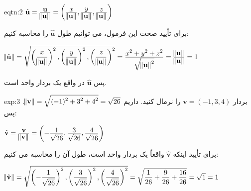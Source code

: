 {\begin{spacing}{1.5}
        \begin{eqtn}{eqtn:2}
            \centering
            $\hat{\textbf{u}}=\frac{\displaystyle\textbf{u}}{\displaystyle\norm{\textbf{u}}}=\left(\frac{\displaystyle x}{\displaystyle\norm{\textbf{u}}},
            \frac{\displaystyle y}{\displaystyle\norm{\textbf{u}}}, \frac{\displaystyle z}{\displaystyle\norm{\textbf{u}}}\right)$
        \end{eqtn}

        برای تأیید صحت این فرمول، می توانیم طول $\hat{\textbf{u}}$ را محاسبه کنیم:

        \begin{center}
            $\norm{\hat{\textbf{u}}}=\sqrt{\displaystyle \left(\frac{\displaystyle x}{\displaystyle\norm{\textbf{u}}}\right)^2,
                \left(\frac{\displaystyle y}{\displaystyle\norm{\textbf{u}}}\right)^2,
                \left(\frac{\displaystyle z}{\displaystyle\norm{\textbf{u}}}\right)^2}=\frac{\displaystyle x^2+y^2+z^2}{\displaystyle\sqrt{\displaystyle \norm{\textbf{u}}^2}}
            =\frac{\displaystyle\norm{\textbf{u}}}{\displaystyle\norm{\textbf{u}}}=1$
        \end{center}

        پس $\hat{\textbf{u}}$ در واقع یک بردار واحد است.

        \begin{example}{exp:3}
            بردار $\textbf{v}=(-1,3,4)$ را نرمال کنید. داریم $\norm{\textbf{v}}=\sqrt{\displaystyle (-1)^2+3^2+4^2}=\sqrt{\displaystyle 26}$. پس:

            \begin{center}
                $\hat{\textbf{v}}=\frac{\displaystyle\textbf{v}}{\displaystyle\norm{\textbf{v}}}=\left(-\frac{\displaystyle 1}{\displaystyle\sqrt{\displaystyle 26}},
                \frac{\displaystyle 3}{\displaystyle\sqrt{\displaystyle 26}}, \frac{\displaystyle 4}{\displaystyle\sqrt{\displaystyle 26}}\right)$
            \end{center}

            برای تأیید اینکه $\hat{\textbf{v}}$ واقعاً یک بردار واحد است، طول آن را محاسبه می کنیم:

            \begin{center}
                $\norm{\hat{\textbf{v}}}=\sqrt{\displaystyle \left(-\frac{\displaystyle 1}{\displaystyle\sqrt{\displaystyle 26}}\right)^2,
                    \left(\frac{\displaystyle 3}{\displaystyle\sqrt{\displaystyle 26}}\right)^2, \left(\frac{\displaystyle 4}{\displaystyle\sqrt{\displaystyle 26}}\right)^2}=
                \sqrt{\displaystyle\frac{\displaystyle 1}{\displaystyle 26}+\frac{\displaystyle 9}{\displaystyle 26}+\frac{\displaystyle 16}{\displaystyle 26}}=\sqrt{\displaystyle 1}=1$
            \end{center}
        \end{example}
    \end{spacing}
}


